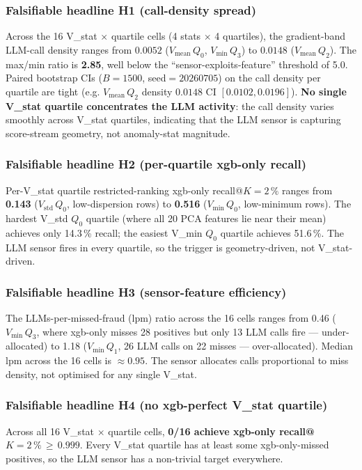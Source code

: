 \documentclass{article}
\begin{document}
\subsubsection{Falsifiable headline H1 (call-density spread)}
Across the 16 V\_stat$\,\times\,$quartile cells
(4 stats $\times$ 4 quartiles), the gradient-band LLM-call density
ranges from $0.0052$ ($V_\mathrm{mean}\,Q_0$, $V_\mathrm{min}\,Q_3$)
to $0.0148$ ($V_\mathrm{mean}\,Q_2$).  The max/min ratio is
\textbf{2.85}, well below the ``sensor-exploits-feature'' threshold
of 5.0.  Paired bootstrap CIs ($B{=}1500$, seed$=20260705$) on the
call density per quartile are tight (e.g. $V_\mathrm{mean}\,Q_2$
density $0.0148$ CI $[0.0102, 0.0196]$).  \textbf{No single V\_stat
quartile concentrates the LLM activity}: the call density varies
smoothly across V\_stat quartiles, indicating that the LLM sensor is
capturing score-stream geometry, not anomaly-stat magnitude.

\subsubsection{Falsifiable headline H2 (per-quartile xgb-only recall)}
Per-V\_stat quartile restricted-ranking xgb-only recall@$K{=}2\,\%$
ranges from \textbf{0.143} ($V_\mathrm{std}\,Q_0$, low-dispersion rows)
to \textbf{0.516} ($V_\mathrm{min}\,Q_0$, low-minimum rows).  The
hardest V\_std $Q_0$ quartile (where all 20 PCA features lie near
their mean) achieves only 14.3\,\% recall; the easiest V\_min $Q_0$
quartile achieves 51.6\,\%.  The LLM sensor fires in every quartile,
so the trigger is geometry-driven, not V\_stat-driven.

\subsubsection{Falsifiable headline H3 (sensor-feature efficiency)}
The LLMs-per-missed-fraud (lpm) ratio across the 16 cells ranges from
0.46 ($V_\mathrm{min}\,Q_3$, where xgb-only misses 28 positives but
only 13 LLM calls fire --- under-allocated) to 1.18 ($V_\mathrm{min}\,Q_1$,
26 LLM calls on 22 misses --- over-allocated).  Median lpm across the
16 cells is $\approx 0.95$.  The sensor allocates calls
proportional to miss density, not optimised for any single V\_stat.

\subsubsection{Falsifiable headline H4 (no xgb-perfect V\_stat quartile)}
Across all 16 V\_stat$\,\times\,$quartile cells, \textbf{0/16 achieve
xgb-only recall@$K{=}2\,\%\,\geq\,0.999$}.  Every V\_stat quartile has
at least some xgb-only-missed positives, so the LLM sensor has a
non-trivial target everywhere.
\end{document}
